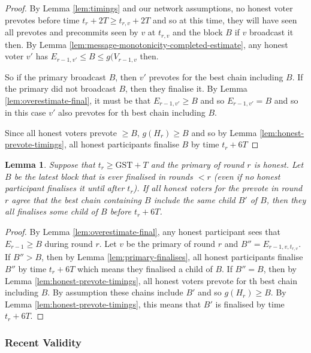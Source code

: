 \documentclass{article}
\newtheorem{lemma}[theorem]{Lemma}
\def\GST{\mathrm{GST}}
\begin{document}
\begin{proof} By Lemma \ref{lem:timings} and our network assumptions, no honest voter  prevotes before time $t_r+2T \geq t_{r,v}+2T$ and so at this time, they will have seen all prevotes and precommits seen by $v$ at $t_{r,v}$ and the block $B$ if $v$ broadcast it then. By Lemma \ref{lem:message-monotonicity-completed-estimate}, any honest voter $v'$ has $E_{r-1,v'} \leq B \leq g(V_{r-1,v}$ then.

So if the primary broadcast $B$, then $v'$ prevotes for the best chain including $B$. If the primary did not broadcast $B$, then they finalise it. By Lemma \ref{lem:overestimate-final}, it must be that $E_{r-1,v'} \geq B$ and so $E_{r-1,v'}=B$ and so in this case $v'$ also prevotes for th best chain including $B$.

Since all honest voters prevote $\geq B$, $g(H_r) \geq B$ and so by Lemma \ref{lem:honest-prevote-timings}, all honest participants finalise $B$ by time $t_r+6T$
\end{proof}



\begin{lemma}
 Suppose that $t_r \geq \GST+T$ and the primary of round $r$ is honest. 
Let $B$ be the latest block that is ever finalised in rounds  $<r$ (even if no honest participant finalises it until after $t_r$). If all honest voters for the prevote in round $r$ agree that the best chain containing $B$ include the same child $B'$ of $B$, then they all finalises some child of $B$ before $t_r+6T$.
\end{lemma}

\begin{proof} By Lemma \ref{lem:overestimate-final}, any honest participant sees that $E_{r-1} \geq B$ during round $r$. Let $v$ be the primary of round $r$ and $B''=E_{r-1,v,t_{r,v}}$. If $B'' > B$, then by Lemma \ref{lem:primary-finalises}, all honest participants finalise $B''$ by time $t_r+6T$ which means they finalised a child of $B$. If $B''=B$, then by Lemma \ref{lem:honest-prevote-timings}, all honest voters prevote for th best chain including $B$.
By assumption these chains include $B'$ and so $g(H_r) \geq B$. By Lemma \ref{lem:honest-prevote-timings}, this means that $B'$ is finalised by time $t_r+6T$.
\end{proof}







\subsubsection{Recent Validity}
\end{document}

